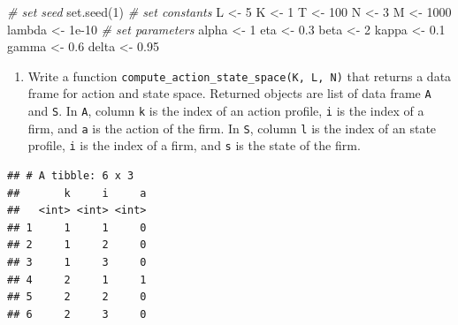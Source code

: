 \documentclass[
]{book}
\newenvironment{Shaded}{\begin{snugshade}}{\end{snugshade}}
\newcommand{\CommentTok}[1]{\textcolor[rgb]{0.56,0.35,0.01}{\textit{#1}}}
\newcommand{\DecValTok}[1]{\textcolor[rgb]{0.00,0.00,0.81}{#1}}
\newcommand{\FloatTok}[1]{\textcolor[rgb]{0.00,0.00,0.81}{#1}}
\newcommand{\FunctionTok}[1]{\textcolor[rgb]{0.00,0.00,0.00}{#1}}
\newcommand{\NormalTok}[1]{#1}
\newcommand{\OtherTok}[1]{\textcolor[rgb]{0.56,0.35,0.01}{#1}}
\newcommand{\SpecialCharTok}[1]{\textcolor[rgb]{0.00,0.00,0.00}{#1}}
\providecommand{\tightlist}{%
  \setlength{\itemsep}{0pt}\setlength{\parskip}{0pt}}
\begin{document}
\begin{Shaded}
\begin{Highlighting}[]
\CommentTok{\# set seed}
\FunctionTok{set.seed}\NormalTok{(}\DecValTok{1}\NormalTok{)}
\CommentTok{\# set constants }
\NormalTok{L }\OtherTok{\textless{}{-}} \DecValTok{5}
\NormalTok{K }\OtherTok{\textless{}{-}} \DecValTok{1}
\NormalTok{T }\OtherTok{\textless{}{-}} \DecValTok{100}
\NormalTok{N }\OtherTok{\textless{}{-}} \DecValTok{3}
\NormalTok{M }\OtherTok{\textless{}{-}} \DecValTok{1000}
\NormalTok{lambda }\OtherTok{\textless{}{-}} \FloatTok{1e{-}10}
\CommentTok{\# set parameters}
\NormalTok{alpha }\OtherTok{\textless{}{-}} \DecValTok{1}
\NormalTok{eta }\OtherTok{\textless{}{-}} \FloatTok{0.3}
\NormalTok{beta }\OtherTok{\textless{}{-}} \DecValTok{2}
\NormalTok{kappa }\OtherTok{\textless{}{-}} \FloatTok{0.1}
\NormalTok{gamma }\OtherTok{\textless{}{-}} \FloatTok{0.6}
\NormalTok{delta }\OtherTok{\textless{}{-}} \FloatTok{0.95}
\end{Highlighting}
\end{Shaded}

\begin{enumerate}
\def\labelenumi{\arabic{enumi}.}
\setcounter{enumi}{1}
\tightlist
\item
  Write a function \texttt{compute\_action\_state\_space(K,\ L,\ N)} that returns a data frame for action and state space. Returned objects are list of data frame \texttt{A} and \texttt{S}. In \texttt{A}, column \texttt{k} is the index of an action profile, \texttt{i} is the index of a firm, and \texttt{a} is the action of the firm. In \texttt{S}, column \texttt{l} is the index of an state profile, \texttt{i} is the index of a firm, and \texttt{s} is the state of the firm.
\end{enumerate}

\begin{Shaded}
\end{Shaded}

\begin{verbatim}
## # A tibble: 6 x 3
##       k     i     a
##   <int> <int> <int>
## 1     1     1     0
## 2     1     2     0
## 3     1     3     0
## 4     2     1     1
## 5     2     2     0
## 6     2     3     0
\end{verbatim}
\end{document}
